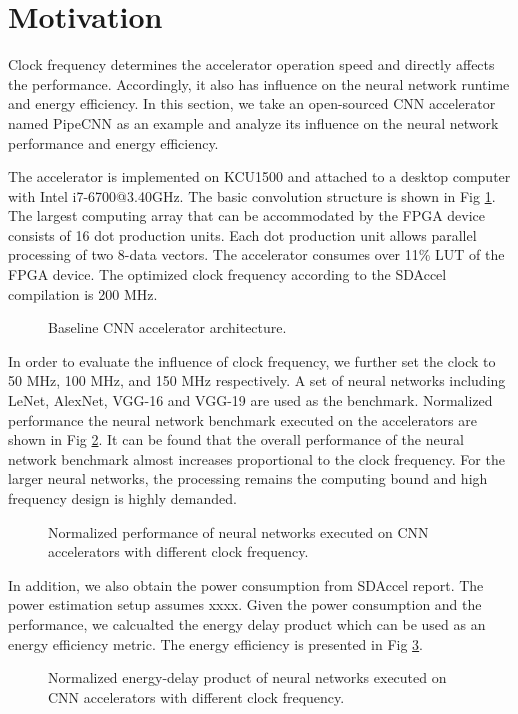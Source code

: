 \section{Motivation} \label{sec:motivation}
Clock frequency determines the accelerator operation speed 
and directly affects the performance. Accordingly, it also has influence on the 
neural network runtime and energy efficiency. In this section, we take 
an open-sourced CNN accelerator named PipeCNN \cite{pipecnn_2} as an example and analyze its 
influence on the neural network performance and energy efficiency.

The accelerator is implemented on KCU1500 and attached to a desktop computer with 
Intel i7-6700@3.40GHz. The basic convolution structure is shown in Fig \ref{fig:cnn-arch}. The largest computing 
array that can be accommodated by the FPGA device consists of 16 dot production units. 
Each dot production unit allows parallel processing of two 8-data vectors.
The accelerator consumes over 11\% LUT of the FPGA device. The optimized clock frequency 
according to the SDAccel compilation is 200 MHz. 

\begin{figure}
    \caption{Baseline CNN accelerator architecture.}
\label{fig:cnn-arch}
\vspace{-1em}
\end{figure}


In order to evaluate the influence of clock 
frequency, we further set the clock to 50 MHz, 100 MHz, and 150 MHz respectively.
A set of neural networks including LeNet, AlexNet, VGG-16 and VGG-19 are used as the benchmark.
Normalized performance the neural network benchmark executed on the accelerators are 
shown in Fig \ref{fig:computing-bound}. It can be found that the 
overall performance of the neural network benchmark
almost increases proportional to the clock frequency. For the larger neural networks, 
the processing remains the computing bound and high frequency design is highly demanded.

\begin{figure}
    \caption{Normalized performance of neural networks executed on CNN accelerators with different clock frequency.}
\label{fig:computing-bound}
\vspace{-1em}
\end{figure}

In addition, we also obtain the power consumption from SDAccel report. 
The power estimation setup assumes xxxx. Given the power consumption and the performance, 
we calcualted the energy delay product which can be used as an energy efficiency metric.
The energy efficiency is presented in Fig \ref{fig:edp}.
\begin{figure}
    \caption{Normalized energy-delay product of neural networks executed on CNN accelerators with different clock frequency.}
\label{fig:edp}
\vspace{-1em}
\end{figure}

